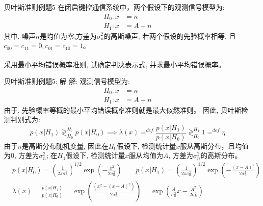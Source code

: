 \begin{frame}{贝叶斯准则例题5}
在闭启键控通信系统中，两个假设下的观测信号模型为:
\begin{align*}
H_0: x&=n  \\
H_1: x&=A+n
\end{align*}
其中, 噪声$n$是均值为零,方差为$\sigma_n^2$的高斯噪声,  若两个假设的先验概率相等, 且$c_{00}=c_{11}=0, c_{01}=c_{10}=1$。\\
~\\
采用最小平均错误概率准则, 试确定判决表示式, 并求最小平均错误概率。
\end{frame}

\begin{frame}[shrink]{贝叶斯准则例题5: 解}
解: 观测信号模型为:
\begin{align*}
H_0: x&=n  \\
H_1: x&=A+n
\end{align*}
由于, 先验概率等概的最小平均错误概率准则就是最大似然准则。 因此, 贝叶斯检测判别式为: 
	\[ p(x|H_1)\mathop{\gtrless}_{H_0}^{H_1}p(x|H_0)\implies \lambda(x)\mathop{=}^{def}\frac{p(x|H_1)}{p(x|H_0)}\mathop{\gtrless}_{H_0}^{H_1}1\mathop{=}^{def}\eta\]
由于$n$是高斯分布随机变量, 因此在$H_0$假设下, 检测统计量$x$服从高斯分布，且均值为0, 方差为$\sigma_n^2$; 在$H_1$假设下, 检测统计量$x$服从均值为$A$, 方差为$\sigma_n^2$的高斯分布。
\begin{align*}
&p(x|H_0)=\left(\frac{1}{2\pi\sigma_n^2}\right)^{1/2}\exp\left(-\frac{x^2}{2\sigma_n^2}\right) \qquad p(x|H_1)=\left(\frac{1}{2\pi\sigma_n^2}\right)^{1/2}\exp\left(-\frac{(x-A)^2}{2\sigma_n^2}\right)\\
&\lambda(x)=\frac{p(x|H_1)}{p(x|H_0)}=\exp\left(\frac{(x^2-(x-A)^2)}{2\sigma_n^2}\right)=\exp\left(\frac{A}{\sigma_n^2}x-\frac{A^2}{2\sigma_n^2}\right)
\end{align*} 
\end{frame}

